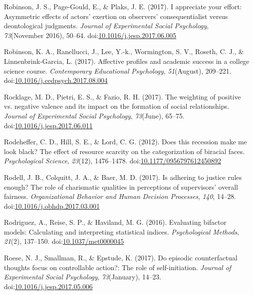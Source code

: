 \documentclass[english,man]{apa6}
\begin{document}
\hypertarget{ref-Robinson2017a}{}
Robinson, J. S., Page-Gould, E., \& Plaks, J. E. (2017). I appreciate
your effort: Asymmetric effects of actors' exertion on observers'
consequentialist versus deontological judgments. \emph{Journal of
Experimental Social Psychology}, \emph{73}(November 2016), 50--64.
doi:\href{https://doi.org/10.1016/j.jesp.2017.06.005}{10.1016/j.jesp.2017.06.005}

\hypertarget{ref-Robinson2017}{}
Robinson, K. A., Ranellucci, J., Lee, Y.-k., Wormington, S. V., Roseth,
C. J., \& Linnenbrink-Garcia, L. (2017). Affective profiles and academic
success in a college science course. \emph{Contemporary Educational
Psychology}, \emph{51}(August), 209--221.
doi:\href{https://doi.org/10.1016/j.cedpsych.2017.08.004}{10.1016/j.cedpsych.2017.08.004}

\hypertarget{ref-Rocklage2017}{}
Rocklage, M. D., Pietri, E. S., \& Fazio, R. H. (2017). The weighting of
positive vs. negative valence and its impact on the formation of social
relationships. \emph{Journal of Experimental Social Psychology},
\emph{73}(June), 65--75.
doi:\href{https://doi.org/10.1016/j.jesp.2017.06.011}{10.1016/j.jesp.2017.06.011}

\hypertarget{ref-Rodeheffer2012}{}
Rodeheffer, C. D., Hill, S. E., \& Lord, C. G. (2012). Does this
recession make me look black? The effect of resource scarcity on the
categorization of biracial faces. \emph{Psychological Science},
\emph{23}(12), 1476--1478.
doi:\href{https://doi.org/10.1177/0956797612450892}{10.1177/0956797612450892}

\hypertarget{ref-Rodell2017}{}
Rodell, J. B., Colquitt, J. A., \& Baer, M. D. (2017). Is adhering to
justice rules enough? The role of charismatic qualities in perceptions
of supervisors' overall fairness. \emph{Organizational Behavior and
Human Decision Processes}, \emph{140}, 14--28.
doi:\href{https://doi.org/10.1016/j.obhdp.2017.03.001}{10.1016/j.obhdp.2017.03.001}

\hypertarget{ref-Rodriguez2016}{}
Rodriguez, A., Reise, S. P., \& Haviland, M. G. (2016). Evaluating
bifactor models: Calculating and interpreting statistical indices.
\emph{Psychological Methods}, \emph{21}(2), 137--150.
doi:\href{https://doi.org/10.1037/met0000045}{10.1037/met0000045}

\hypertarget{ref-Roese2017}{}
Roese, N. J., Smallman, R., \& Epstude, K. (2017). Do episodic
counterfactual thoughts focus on controllable action?: The role of
self-initiation. \emph{Journal of Experimental Social Psychology},
\emph{73}(January), 14--23.
doi:\href{https://doi.org/10.1016/j.jesp.2017.05.006}{10.1016/j.jesp.2017.05.006}
\end{document}
